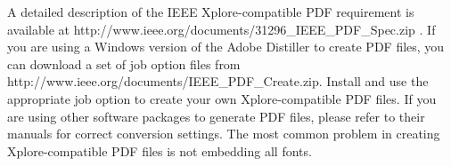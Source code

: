 \documentclass[journal]{IEEEtran}
\begin{document}
A detailed description of the IEEE Xplore-compatible PDF requirement is available at http://www.ieee.org/documents/31296\_IEEE\_PDF\_Spec.zip \cite{IEEEPDFRequirement401}.  
If you are using a Windows version of the Adobe Distiller to create PDF files, you can download a set of job option files from http://www.ieee.org/documents/IEEE\_PDF\_Create.zip. Install and use the appropriate job option to create your own Xplore-compatible PDF files.  
If you are using other software packages to generate PDF files, please refer to their manuals for correct conversion settings.  The most common problem in creating Xplore-compatible PDF files is not embedding all fonts.
 


%
%



%
%
\end{document}
